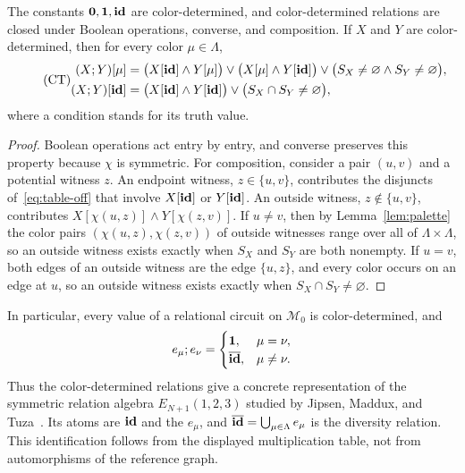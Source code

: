 \begin{lemma}\label{lem:tables}
The constants $\mathbf{0},\mathbf{1},\mathbf{id}$ are color-determined, and
color-determined relations are closed under Boolean operations, converse,
and composition. If $X$ and $Y$ are color-determined, then for every color
$\mu\in\Lambda$,
\begin{equation*}\tag{CT}\label{eq:table-off}
\begin{aligned}
 (X;Y)[\mu]
  &=\bigl(X[\mathbf{id}]\land Y[\mu]\bigr)\lor\bigl(X[\mu]\land Y[\mathbf{id}]\bigr)
       \lor\bigl(S_X\ne\varnothing\land S_Y\ne\varnothing\bigr),\\
 (X;Y)[\mathbf{id}]
  &=\bigl(X[\mathbf{id}]\land Y[\mathbf{id}]\bigr)\lor\bigl(S_X\cap S_Y\ne\varnothing\bigr),
\end{aligned}
\end{equation*}
where a condition stands for its truth value.
\end{lemma}
\begin{proof}
Boolean operations act entry by entry, and converse preserves this
property because $\chi$ is symmetric. For composition, consider a pair
$(u,v)$ and a potential witness $z$. An endpoint witness,
$z\in\{u,v\}$, contributes the disjuncts of~\eqref{eq:table-off} that involve
$X[\mathbf{id}]$ or $Y[\mathbf{id}]$. An outside witness, $z\notin\{u,v\}$,
contributes $X[\chi(u,z)]\land Y[\chi(z,v)]$. If $u\ne v$, then by
Lemma~\ref{lem:palette} the color pairs $(\chi(u,z),\chi(z,v))$ of outside
witnesses range over all of $\Lambda\times\Lambda$, so an outside witness
exists exactly when $S_X$ and $S_Y$ are both nonempty. If $u=v$, both
edges of an outside witness are the edge $\{u,z\}$, and every color
occurs on an edge at $u$, so an outside witness exists exactly when
$S_X\cap S_Y\ne\varnothing$.
\end{proof}
In particular, every value of a relational circuit on $\mathcal M_0$ is
color-determined, and
\[
 e_\mu;e_\nu=
 \begin{cases}\mathbf{1},&\mu=\nu,\\
 \overline{\mathbf{id}},&\mu\ne\nu.
 \end{cases}
\]
Thus the color-determined relations give a concrete representation of
the symmetric relation algebra $E_{N+1}(1,2,3)$ studied by Jipsen,
Maddux, and Tuza~\citep{jipsen-maddux-tuza1995}. Its atoms are $\mathbf{id}$
and the $e_\mu$, and $\overline{\mathbf{id}}=\bigcup_{\mu\in\Lambda}e_\mu$ is
the diversity relation. This identification follows from the displayed
multiplication table, not from automorphisms of the reference graph.


